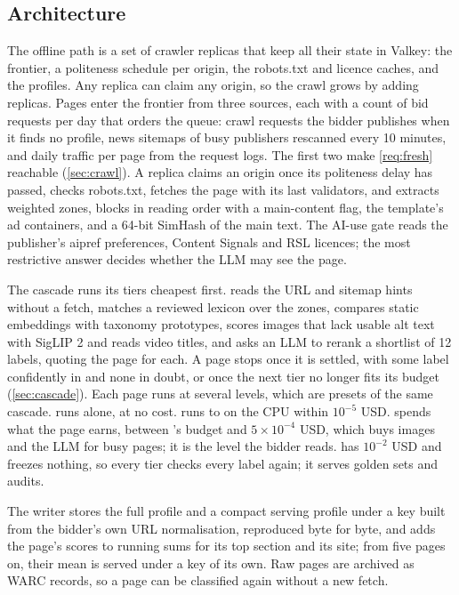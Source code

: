 \subsection{Architecture}\label{sec:overview-arch}

The offline path is a set of crawler replicas that keep all their state in Valkey: the frontier, a politeness schedule per origin, the robots.txt and licence caches, and the profiles. Any replica can claim any origin, so the crawl grows by adding replicas. Pages enter the frontier from three sources, each with a count of bid requests per day that orders the queue: crawl requests the bidder publishes when it finds no profile, news sitemaps of busy publishers rescanned every 10 minutes, and daily traffic per page from the request logs. The first two make \ref{req:fresh} reachable (\cref{sec:crawl}). A replica claims an origin once its politeness delay has passed, checks robots.txt, fetches the page with its last validators, and extracts weighted zones, blocks in reading order with a main-content flag, the template's ad containers, and a 64-bit SimHash of the main text. The AI-use gate reads the publisher's aipref preferences, Content Signals and RSL licences; the most restrictive answer decides whether the LLM may see the page.

The cascade runs its tiers cheapest first.  reads the URL and sitemap hints without a fetch,  matches a reviewed lexicon over the zones,  compares static embeddings with taxonomy prototypes,  scores images that lack usable alt text with SigLIP 2 and reads video titles, and  asks an LLM to rerank a shortlist of 12 labels, quoting the page for each. A page stops once it is settled, with some label confidently in and none in doubt, or once the next tier no longer fits its budget (\cref{sec:cascade}). Each page runs at several levels, which are presets of the same cascade.  runs  alone, at no cost.  runs  to  on the CPU within $10^{-5}$ USD.  spends what the page earns, between 's budget and $5\times10^{-4}$ USD, which buys images and the LLM for busy pages; it is the level the bidder reads.  has $10^{-2}$ USD and freezes nothing, so every tier checks every label again; it serves golden sets and audits.

The writer stores the full profile and a compact serving profile under a key built from the bidder's own URL normalisation, reproduced byte for byte, and adds the page's scores to running sums for its top section and its site; from five pages on, their mean is served under a key of its own. Raw pages are archived as WARC records, so a page can be classified again without a new fetch.


